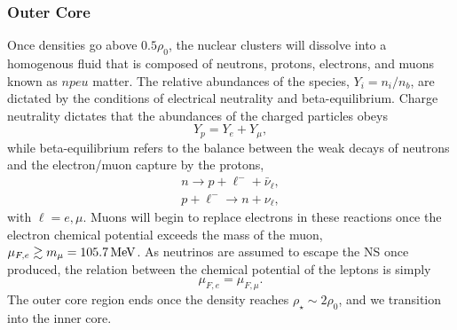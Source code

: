 \subsubsection*{Outer Core}
Once densities go above $0.5\rho_0$, the nuclear clusters will dissolve into a homogenous fluid that is composed of neutrons, protons, electrons, and muons known as $npeu$ matter. The relative abundances of the species, $Y_i=n_i/n_b$, are dictated by the conditions of electrical neutrality and beta-equilibrium.
Charge neutrality dictates that the abundances of the charged particles obeys
\begin{equation}
    Y_p = Y_e + Y_\mu,
\end{equation}
while beta-equilibrium refers to the balance between the weak decays of neutrons and the electron/muon capture by the protons,
\begin{gather}
    n \rightarrow p + \ell^- +\bar{\nu}_\ell,\label{ch2:eq:beta_decay}\\
    p + \ell^- \rightarrow n + \nu_\ell,\label{ch2:eq:electron_capture}
\end{gather}
with $\ell = e, \mu$. Muons will begin to replace electrons in these reactions once the electron chemical potential exceeds the mass of the muon, $\mu_{F,e} \gtrsim m_\mu = 105.7{\rm \,MeV}$. As neutrinos are assumed to escape the NS once produced, the relation between the chemical potential of the leptons is simply
\begin{equation}
    \mu_{F,e} = \mu_{F,\mu}.
\end{equation}
The outer core region ends once the density reaches $\rho_\star \sim 2\rho_0$, and we transition into the inner core.

